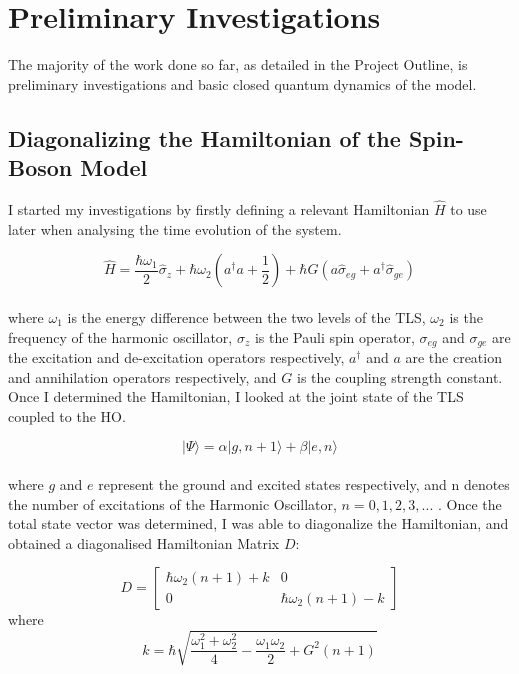 \documentclass[12pt,a4paper]{article}
\begin{document}
{\section{Preliminary Investigations}}
The majority of the work done so far, as detailed in the Project Outline, is preliminary investigations and basic closed quantum dynamics of the model. 
\\
\subsection{\normalsize{Diagonalizing the Hamiltonian of the Spin-Boson Model}}

I started my investigations by firstly defining a relevant Hamiltonian\cite{Hagelstein2LSHO_Desc} $\hat{H}$ to use later when analysing the time evolution of the system. 

\begin{equation}
    \hat{H} = \frac{\hbar\omega_1}{2}\hat{\sigma}_z + \hbar\omega_2(a^\dagger a + \frac{1}{2}) + \hbar G(a\hat{\sigma}_{eg} + a^\dagger\hat{\sigma}_{ge})
\end{equation}
\\
where $\omega_1$ is the energy difference between the two levels of the TLS, $\omega_2$ is the frequency of the harmonic oscillator, $\sigma_z$ is the Pauli spin operator, $\sigma_{eg}$ and $\sigma_{ge}$ are the excitation and de-excitation operators respectively, $a^\dagger$ and $a$ are the creation and annihilation operators respectively, and $G$ is the coupling strength constant.
\\
Once I determined the Hamiltonian, I looked at the joint state of the TLS coupled to the HO. 

\begin{equation}
    |\Psi\rangle = \alpha|g,n+1\rangle + \beta|e,n\rangle
\end{equation}
\\
where $g$ and $e$ represent the ground and excited states respectively, and n denotes the number of excitations of the Harmonic Oscillator, $n=0,1,2,3,...$ . Once the total state vector was determined, I was able to diagonalize the Hamiltonian, and obtained a diagonalised Hamiltonian Matrix $D$:

\begin{equation}
D = \begin{bmatrix}
\hbar\omega_2(n+1) + k & 0 \\
0 & \hbar\omega_2(n+1) - k
\end{bmatrix}
\end{equation}
\vspace{2cm}
where 
\begin{equation*}
    k = \hbar\sqrt{\frac{\omega_1^2 + \omega_2^2}{4}-\frac{\omega_1\omega_2}{2}+G^2(n+1)}
\end{equation*}
\\
\end{document}
